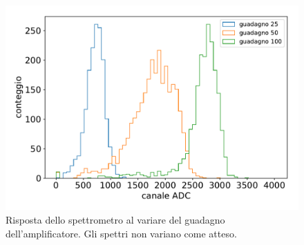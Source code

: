 \begin{figure}[h]
	\centering
	\includegraphics[width=30 em]{immagini/all8}
	\caption{Risposta dello spettrometro al variare del guadagno dell'amplificatore. Gli spettri non variano come atteso.}
	\label{fig:guadagno}
\end{figure}